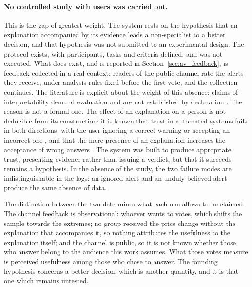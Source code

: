 \paragraph{No controlled study with users was carried out.}
This is the gap of greatest weight. The system rests on the hypothesis that an explanation
accompanied by its evidence leads a non-specialist to a better decision, and that hypothesis was not
submitted to an experimental design. The protocol exists, with participants, tasks and criteria
defined, and was not executed. What does exist, and is reported in Section~\ref{sec:av_feedback}, is
feedback collected in a real context: readers of the public channel rate the alerts they receive,
under analysis rules fixed before the first vote, and the collection continues. The literature is
explicit about the weight of this absence: claims of interpretability demand evaluation and are not
established by declaration \autocite{doshivelez2018considerations}. The reason is not a formal one.
The effect of an explanation on a person is not deducible from its construction: it is known that
trust in automated systems fails in both directions, with the user ignoring a correct warning or
accepting an incorrect one \autocite{lee2004trust}, and that the mere presence of an explanation
increases the acceptance of wrong answers \autocite{bansal2021whole}. The system was built to
produce appropriate trust, presenting evidence rather than issuing a verdict, but that it succeeds
remains a hypothesis. In the absence of the study, the two failure modes are indistinguishable in
the logs: an ignored alert and an unduly believed alert produce the same absence of data.

The distinction between the two determines what each one allows to be claimed. The channel
feedback is observational: whoever wants to votes, which shifts the sample towards the extremes; no
group received the price change without the explanation that accompanies it, so nothing attributes
the usefulness to the explanation itself; and the channel is public, so it is not known whether
those who answer belong to the audience this work assumes. What those votes measure is perceived
usefulness among those who chose to answer. The founding hypothesis concerns a better decision,
which is another quantity, and it is that one which remains untested.

